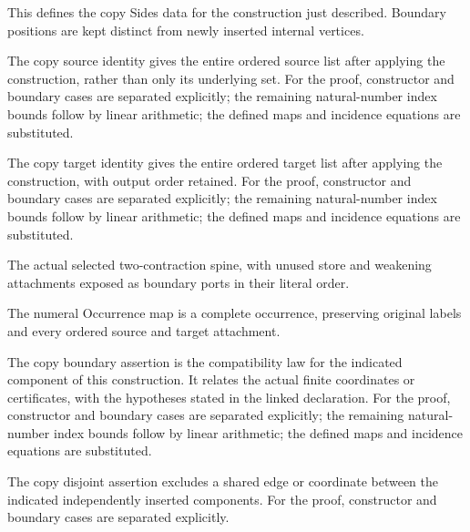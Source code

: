 This defines the copy Sides data for the construction just described. Boundary positions are kept distinct from newly inserted internal vertices.
\par{}

The copy source identity gives the entire ordered source list after applying the construction, rather than only its underlying set.
For the proof, constructor and boundary cases are separated explicitly; the remaining natural-number index bounds follow by linear arithmetic; the defined maps and incidence equations are substituted.
\par{}

The copy target identity gives the entire ordered target list after applying the construction, with output order retained.
For the proof, constructor and boundary cases are separated explicitly; the remaining natural-number index bounds follow by linear arithmetic; the defined maps and incidence equations are substituted.
\par{}

The actual selected two-contraction spine, with unused store and weakening attachments exposed as boundary ports in their literal order.
\par{}

The numeral Occurrence map is a complete occurrence, preserving original labels and every ordered source and target attachment.
\par{}

The copy boundary assertion is the compatibility law for the indicated component of this construction. It relates the actual finite coordinates or certificates, with the hypotheses stated in the linked declaration.
For the proof, constructor and boundary cases are separated explicitly; the remaining natural-number index bounds follow by linear arithmetic; the defined maps and incidence equations are substituted.
\par{}

The copy disjoint assertion excludes a shared edge or coordinate between the indicated independently inserted components.
For the proof, constructor and boundary cases are separated explicitly.
\par{}

